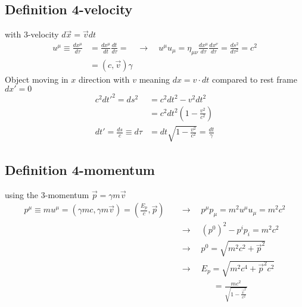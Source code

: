 \documentclass[../main.tex]{subfiles}
\begin{document}
\subsection{Definition 4-velocity}
with 3-velocity $d\vec{x} = \vec{v} dt$
\begin{align}
    u^\mu\equiv\frac{dx^\mu}{d\tau}&=\frac{dx^\mu}{dt}\frac{dt}{d\tau}=\quad\rightarrow\quad u^\mu u_\mu=\eta_{\mu\nu}\frac{dx^\mu}{d\tau} \frac{dx^\nu}{d\tau}=\frac{ds^2}{d\tau^2}=c^2\\
    &=(c,\vec{v})\gamma
\end{align}
Object moving in $x$ direction with $v$ meaning $dx=v\cdot dt$ compared to
rest frame $dx'=0$
\begin{align}
    c^2dt'^2=ds^2 &= c^2dt^2- v^2 dt^2\\
    &=c^2dt^2\left(1-\frac{v^2}{c^2}\right)\\
    dt'=\frac{ds}{c}\equiv d\tau&=dt\sqrt{1-\frac{v^2}{c^2}}=\frac{dt}{\gamma}
\end{align}

\subsection{Definition 4-momentum}
using the 3-momentum $\vec{p}=\gamma m\vec{v}$
\begin{align}
    p^\mu \equiv mu^\mu=(\gamma mc,\gamma m\vec{v})=\left(\frac{E_p}{c},\vec{p}\right)\quad&\rightarrow\quad p^\mu p _\mu=m^2u^\mu u_\mu=m^2c^2\\
    &\rightarrow\quad (p^0)^2-p^ip_i=m^2c^2\\
    &\rightarrow\quad p^0=\sqrt{m^2c^2+\vec{p}^2}\\
    &\rightarrow\quad E_p=\sqrt{m^2c^4+\vec{p}^2c^2}\\
    &\qquad\qquad=\frac{mc^2}{\sqrt{1-\frac{\vec{v}^2}{c^2}}}
\end{align}
\end{document}
